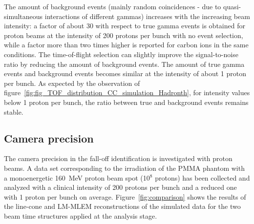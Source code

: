The amount of background events (mainly random coincidences - due to quasi-simultaneous interactions of different gammas) increases with the increasing beam intensity: a factor of about 30 with respect to true gamma events is obtained for proton beams at  the intensity of 200 protons per bunch with no event selection, while a factor more than two times higher is reported for carbon ions in the same conditions. The time-of-flight selection can slightly improve the signal-to-noise ratio by reducing the amount of background events. The amount of true gamma events and background events becomes similar at the intensity of about 1 proton per bunch. As expected by the observation of figure~\ref{fig:fig_TOF_distribution_CC_simulation_Hadronth}, for intensity values below 1 proton per bunch, the ratio between true and background events remains stable. 


\subsection{Camera precision}
\label{Results::precision_reconstruction}
The camera precision in the fall-off identification is investigated with proton beams.
A data set corresponding to the irradiation of the PMMA phantom with a monoenergetic 160~MeV proton beam spot (10$^8$ protons) has been collected and analyzed with a clinical intensity of 200 protons per bunch and a reduced one with 1 proton per bunch on average. 
Figure~\ref{fig:comparison} shows the results of the line-cone and LM-MLEM reconstructions of the simulated data for the two beam time structures applied at the analysis stage.  

